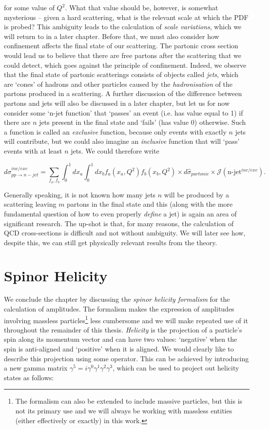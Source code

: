 for some value of $Q^2$. What that value should be, however, is somewhat mysterious -- given a hard scattering, what is the relevant scale at which the PDF is probed? This ambiguity leads to the calculation of \emph{scale variations}, which we will return to in a later chapter. Before that, we must also consider how confinement affects the final state of our scattering. The partonic cross section would lead us to believe that there are free partons after the scattering that we could detect, which goes against the principle of confinement. Indeed, we observe that the final state of partonic scatterings consists of objects called \emph{jets}, which are `cones' of hadrons and other particles caused by the \emph{hadronisation} of the partons produced in a scattering. A further discussion of the difference between partons and jets will also be discussed in a later chapter, but let us for now consider some `n-jet function' that `passes' an event (i.e. has value equal to 1) if there are $n$ jets present in the final state and `fails' (has value 0) otherwise. Such a function is called an \emph{exclusive} function, because only events with exactly $n$ jets will contribute, but we could also imagine an \emph{inclusive} function that will `pass' events with at least $n$ jets. We could therefore write

\begin{equation}
d \sigma_{pp \to n-jet}^{inc/exc} = \sum_{f_a, f_b} \int_0^1 dx_a \int_0^1 dx_b f_a(x_a, Q^2) f_b(x_b, Q^2) \times d\hat{\sigma}_{partonic} \times \mathcal{J}(\text{n-jet}^{inc/exc}).
\end{equation}

Generally speaking, it is not known how many jets $n$ will be produced by a scattering leaving $m$ partons in the final state and this (along with the more fundamental question of how to even properly \emph{define} a jet) is again an area of significant research. The up-shot is that, for many reasons, the calculation of QCD cross-sections is difficult and not without ambiguity. We will later see how, despite this, we can still get physically relevant results from the theory. 

\section{Spinor Helicity}
We conclude the chapter by discussing the \emph{spinor helicity formalism} for the calculation of amplitudes. The formalism makes the expression of amplitudes involving massless particles\footnote{The formalism can also be extended to include massive particles, but this is not its primary use and we will always be working with massless entities (either effectively or exactly) in this work.} less cumbersome and we will make repeated use of it throughout the remainder of this thesis. \emph{Helicity} is the projection of a particle's spin along its momentum vector and can have two values: `negative' when the spin is anti-aligned and `positive' when it is aligned. We would clearly like to describe this projection using some operator. This can be achieved by introducing a new gamma matrix $\gamma^5 = i \gamma^0 \gamma^1 \gamma^2 \gamma^3$, which can be used to project out helicity states as follows:


